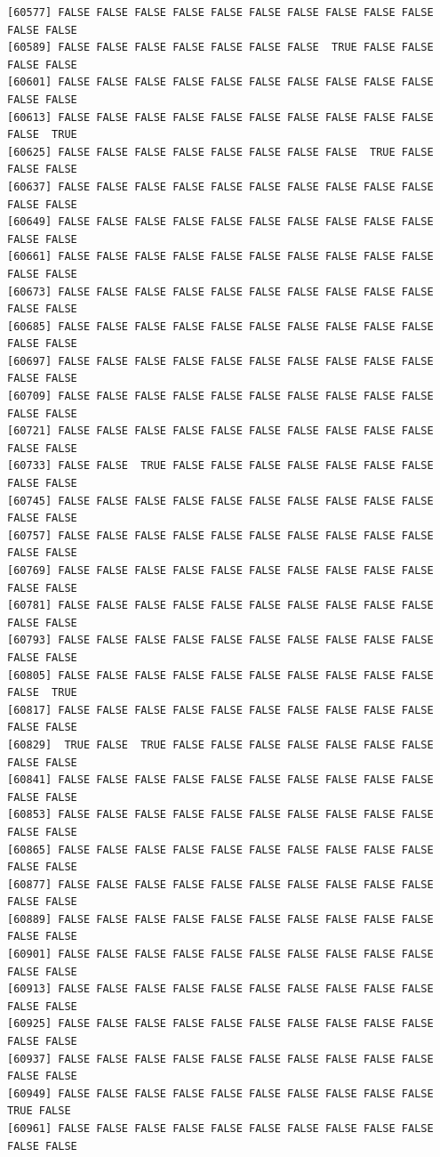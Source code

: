 \documentclass[
  a4paper,
  DIV=11,
  numbers=noendperiod]{scrartcl}
\begin{document}
\begin{verbatim}
[60577] FALSE FALSE FALSE FALSE FALSE FALSE FALSE FALSE FALSE FALSE FALSE FALSE
[60589] FALSE FALSE FALSE FALSE FALSE FALSE FALSE  TRUE FALSE FALSE FALSE FALSE
[60601] FALSE FALSE FALSE FALSE FALSE FALSE FALSE FALSE FALSE FALSE FALSE FALSE
[60613] FALSE FALSE FALSE FALSE FALSE FALSE FALSE FALSE FALSE FALSE FALSE  TRUE
[60625] FALSE FALSE FALSE FALSE FALSE FALSE FALSE FALSE  TRUE FALSE FALSE FALSE
[60637] FALSE FALSE FALSE FALSE FALSE FALSE FALSE FALSE FALSE FALSE FALSE FALSE
[60649] FALSE FALSE FALSE FALSE FALSE FALSE FALSE FALSE FALSE FALSE FALSE FALSE
[60661] FALSE FALSE FALSE FALSE FALSE FALSE FALSE FALSE FALSE FALSE FALSE FALSE
[60673] FALSE FALSE FALSE FALSE FALSE FALSE FALSE FALSE FALSE FALSE FALSE FALSE
[60685] FALSE FALSE FALSE FALSE FALSE FALSE FALSE FALSE FALSE FALSE FALSE FALSE
[60697] FALSE FALSE FALSE FALSE FALSE FALSE FALSE FALSE FALSE FALSE FALSE FALSE
[60709] FALSE FALSE FALSE FALSE FALSE FALSE FALSE FALSE FALSE FALSE FALSE FALSE
[60721] FALSE FALSE FALSE FALSE FALSE FALSE FALSE FALSE FALSE FALSE FALSE FALSE
[60733] FALSE FALSE  TRUE FALSE FALSE FALSE FALSE FALSE FALSE FALSE FALSE FALSE
[60745] FALSE FALSE FALSE FALSE FALSE FALSE FALSE FALSE FALSE FALSE FALSE FALSE
[60757] FALSE FALSE FALSE FALSE FALSE FALSE FALSE FALSE FALSE FALSE FALSE FALSE
[60769] FALSE FALSE FALSE FALSE FALSE FALSE FALSE FALSE FALSE FALSE FALSE FALSE
[60781] FALSE FALSE FALSE FALSE FALSE FALSE FALSE FALSE FALSE FALSE FALSE FALSE
[60793] FALSE FALSE FALSE FALSE FALSE FALSE FALSE FALSE FALSE FALSE FALSE FALSE
[60805] FALSE FALSE FALSE FALSE FALSE FALSE FALSE FALSE FALSE FALSE FALSE  TRUE
[60817] FALSE FALSE FALSE FALSE FALSE FALSE FALSE FALSE FALSE FALSE FALSE FALSE
[60829]  TRUE FALSE  TRUE FALSE FALSE FALSE FALSE FALSE FALSE FALSE FALSE FALSE
[60841] FALSE FALSE FALSE FALSE FALSE FALSE FALSE FALSE FALSE FALSE FALSE FALSE
[60853] FALSE FALSE FALSE FALSE FALSE FALSE FALSE FALSE FALSE FALSE FALSE FALSE
[60865] FALSE FALSE FALSE FALSE FALSE FALSE FALSE FALSE FALSE FALSE FALSE FALSE
[60877] FALSE FALSE FALSE FALSE FALSE FALSE FALSE FALSE FALSE FALSE FALSE FALSE
[60889] FALSE FALSE FALSE FALSE FALSE FALSE FALSE FALSE FALSE FALSE FALSE FALSE
[60901] FALSE FALSE FALSE FALSE FALSE FALSE FALSE FALSE FALSE FALSE FALSE FALSE
[60913] FALSE FALSE FALSE FALSE FALSE FALSE FALSE FALSE FALSE FALSE FALSE FALSE
[60925] FALSE FALSE FALSE FALSE FALSE FALSE FALSE FALSE FALSE FALSE FALSE FALSE
[60937] FALSE FALSE FALSE FALSE FALSE FALSE FALSE FALSE FALSE FALSE FALSE FALSE
[60949] FALSE FALSE FALSE FALSE FALSE FALSE FALSE FALSE FALSE FALSE  TRUE FALSE
[60961] FALSE FALSE FALSE FALSE FALSE FALSE FALSE FALSE FALSE FALSE FALSE FALSE

\end{verbatim}
\end{document}
